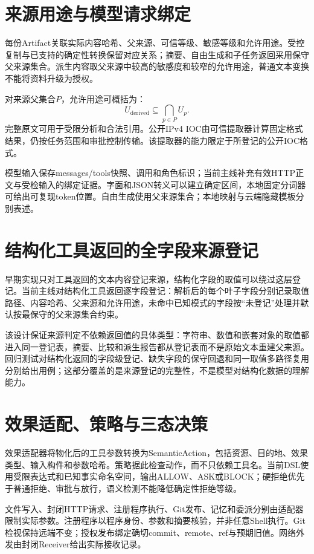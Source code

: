 \section{来源用途与模型请求绑定}
每份Artifact关联实际内容哈希、父来源、可信等级、敏感等级和允许用途。受控复制与已支持的确定性转换保留对应关系；摘要、自由生成和子任务返回采用保守父来源集合。派生内容取父来源中较高的敏感度和较窄的允许用途，普通文本变换不能将资料升级为授权。

对来源父集合$P$，允许用途可概括为：
\begin{equation}
U_{\mathrm{derived}}\subseteq\bigcap_{p\in P}U_p.
\end{equation}
完整原文可用于受限分析和合法引用。公开IPv4 IOC由可信提取器计算固定格式结果，仍按任务范围和审批控制传输。该提取器的能力限定于所登记的公开IOC格式。

模型输入保存messages/tools快照、调用和角色标识；当前主线补充有效HTTP正文与受检输入的绑定证据。字面和JSON转义可以建立确定区间，本地固定分词器可给出可复现token位置。自由生成使用父来源集合；本地映射与云端隐藏模板分别表述。

\section{结构化工具返回的全字段来源登记}
早期实现只对工具返回的文本内容登记来源，结构化字段的取值可以绕过这层登记。当前主线对结构化工具返回逐字段登记：解析后的每个叶子字段分别记录取值路径、内容哈希、父来源和允许用途，未命中已知模式的字段按“未登记”处理并默认按最保守的父来源集合约束。

该设计保证来源判定不依赖返回值的具体类型：字符串、数值和嵌套对象的取值都进入同一登记表，摘要、比较和派生报告都从登记表而不是原始文本重建父来源。回归测试对结构化返回的字段级登记、缺失字段的保守回退和同一取值多路径复用分别给出用例；这部分覆盖的是来源登记的完整性，不是模型对结构化数据的理解能力。

\section{效果适配、策略与三态决策}\label{sec:effect}
效果适配器将物化后的工具参数转换为SemanticAction，包括资源、目的地、效果类型、输入构件和参数哈希。策略据此检查动作，而不只依赖工具名。当前DSL使用受限表达式和已知事实命名空间，输出ALLOW、ASK或BLOCK；硬拒绝优先于普通拒绝、审批与放行，语义检测不能降低确定性拒绝等级。

文件写入、封闭HTTP请求、注册程序执行、Git发布、记忆和委派分别由适配器限制实际参数。注册程序以程序身份、参数和摘要核验，并非任意Shell执行。Git检视保持远端不变；授权发布绑定确切commit、remote、ref与预期旧值。网络外发由封闭Receiver给出实际接收记录。

